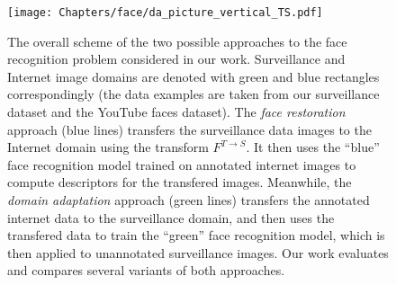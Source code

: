 




%
 \begin{figure}
 \centering
    \texttt{[image: Chapters/face/da\_picture\_vertical\_TS.pdf]}
    \caption{The overall scheme of the two possible approaches to the face recognition problem considered in our work. Surveillance and Internet image domains are denoted with green and blue rectangles correspondingly (the data examples are taken from our surveillance dataset and the YouTube faces dataset).
    The \textit{face restoration} approach (blue lines) transfers the surveillance data images to the Internet domain using the transform $F^{T \rightarrow S}$. It then uses the ``blue'' face recognition model trained on annotated internet images to compute descriptors for the transfered images. Meanwhile, the \textit{domain adaptation} approach (green lines) transfers the annotated internet data to the surveillance domain, and then uses the transfered data to train the ``green'' face recognition model, which is then applied to unannotated surveillance images. Our work evaluates and compares several variants of both approaches.}
  \end{figure}

